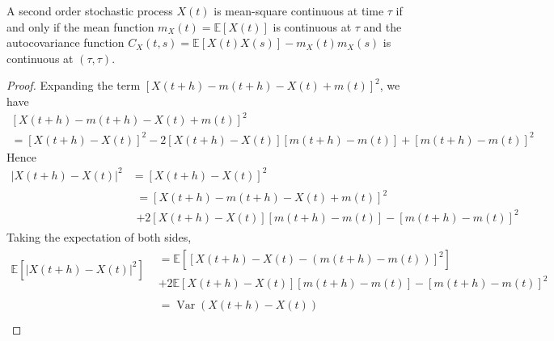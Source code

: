 \documentclass[11pt]{report} %
\begin{document}
\begin{theorem}
A second order stochastic process $X\left(t\right)$ is mean-square continuous at time $\tau$ if and only if the mean function $m_{X}\left(t\right) = \mathbb{E}\left[X\left(t\right)\right]$ is continuous at $\tau$ and the autocovariance function $C_{X}\left(t, s\right) = \mathbb{E}\left[X\left(t\right)X\left(s\right)\right] - m_{X}\left(t\right)m_{X}\left(s\right)$ is continuous at $\left(\tau, \tau\right)$.
\end{theorem}
\begin{proof}
Expanding the term $\left[X\left(t + h\right) - m\left(t + h\right) - X\left(t\right) + m\left(t\right)\right]^{2}$, we have
\begin{multline}
\left[X\left(t + h\right) - m\left(t + h\right) - X\left(t\right) + m\left(t\right)\right]^{2} \\
= \left[X\left(t + h\right) - X\left(t\right)\right]^{2} - 2\left[X\left(t + h\right) - X\left(t\right)\right]\left[m\left(t + h\right) - m\left(t\right)\right] + \left[m\left(t + h\right) - m\left(t\right)\right]^{2}
\end{multline}
Hence
\begin{align}
\left|X\left(t + h\right) - X\left(t\right)\right|^{2} &= \left[X\left(t + h\right) - X\left(t\right)\right]^{2} \\
&\begin{multlined}= \left[X\left(t + h\right) - m\left(t + h\right) - X\left(t\right) + m\left(t\right)\right]^{2}  \\
+ 2\left[X\left(t + h\right) - X\left(t\right)\right]\left[m\left(t + h\right) - m\left(t\right)\right] - \left[m\left(t + h\right) - m\left(t\right)\right]^{2}
\end{multlined}
\end{align}
Taking the expectation of both sides,
\begin{align}
\mathbb{E}\left[\left|X\left(t + h\right) - X\left(t\right)\right|^{2}\right] &\begin{multlined}= \mathbb{E}\left[\left[X\left(t + h\right) - X\left(t\right) - \left(m\left(t + h\right) - m\left(t\right)\right)\right]^{2}\right]  \\
+ 2\mathbb{E}\left[X\left(t + h\right) - X\left(t\right)\right]\left[m\left(t + h\right) - m\left(t\right)\right] - \left[m\left(t + h\right) - m\left(t\right)\right]^{2}
\end{multlined} \\
&\begin{multlined}= \operatorname{Var}\left(X\left(t + h\right) - X\left(t\right)\right)\\

\end{multlined}
\end{align}
\end{proof}
\end{document}
